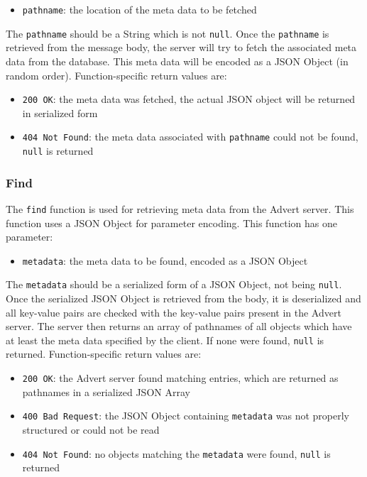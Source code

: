 \begin{itemize}
  \item \texttt{pathname}: the location of the meta data to be fetched
\end{itemize}

The \texttt{pathname} should be a String which is not \texttt{null}. Once the
\texttt{pathname} is retrieved from the message body, the server will try to
fetch the associated meta data from the database. This meta data will be
encoded as a JSON Object (in random order). Function-specific return values are:

\begin{itemize}
  \item \texttt{200 OK}: the meta data was fetched, the actual JSON object will
  be returned in serialized form
  \item \texttt{404 Not Found}: the meta data associated with \texttt{pathname}
  could not be found, \texttt{null} is returned
\end{itemize}

\subsubsection{Find}
\label{find}
The \texttt{find} function is used for retrieving meta data from the Advert
server. This function uses a JSON Object for parameter encoding. This function
has one parameter:

\begin{itemize}
  \item \texttt{metadata}: the meta data to be found, encoded as a JSON Object
\end{itemize}

The \texttt{metadata} should be a serialized form of a JSON Object, not being
\texttt{null}. Once the serialized JSON Object is retrieved from the body, it
is deserialized and all key-value pairs are checked with the key-value pairs
present in the Advert server. The server then returns an array of
pathnames of all objects which have at least the meta data specified by the
client. If none were found, \texttt{null} is returned. Function-specific return
values are:

\begin{itemize}
  \item \texttt{200 OK}: the Advert server found matching entries, which are
  returned as pathnames in a serialized JSON Array
  \item \texttt{400 Bad Request}: the JSON Object containing \texttt{metadata}
  was not properly structured or could not be read
  \item \texttt{404 Not Found}: no objects matching the \texttt{metadata} were
  found, \texttt{null} is returned
\end{itemize}

